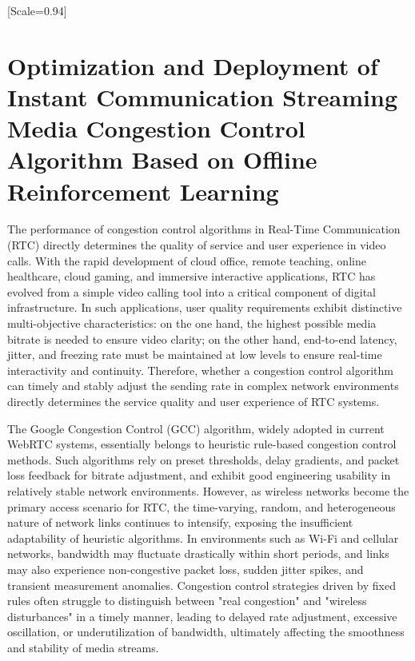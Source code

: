 
{
[Scale=0.94]
\chapter{Optimization and Deployment of Instant Communication Streaming Media Congestion Control Algorithm Based on Offline Reinforcement Learning}

The performance of congestion control algorithms in Real-Time Communication (RTC) directly determines the quality of service and user experience in video calls. With the rapid development of cloud office, remote teaching, online healthcare, cloud gaming, and immersive interactive applications, RTC has evolved from a simple video calling tool into a critical component of digital infrastructure. In such applications, user quality requirements exhibit distinctive multi-objective characteristics: on the one hand, the highest possible media bitrate is needed to ensure video clarity; on the other hand, end-to-end latency, jitter, and freezing rate must be maintained at low levels to ensure real-time interactivity and continuity. Therefore, whether a congestion control algorithm can timely and stably adjust the sending rate in complex network environments directly determines the service quality and user experience of RTC systems.

The Google Congestion Control (GCC) algorithm, widely adopted in current WebRTC systems, essentially belongs to heuristic rule-based congestion control methods. Such algorithms rely on preset thresholds, delay gradients, and packet loss feedback for bitrate adjustment, and exhibit good engineering usability in relatively stable network environments. However, as wireless networks become the primary access scenario for RTC, the time-varying, random, and heterogeneous nature of network links continues to intensify, exposing the insufficient adaptability of heuristic algorithms. In environments such as Wi-Fi and cellular networks, bandwidth may fluctuate drastically within short periods, and links may also experience non-congestive packet loss, sudden jitter spikes, and transient measurement anomalies. Congestion control strategies driven by fixed rules often struggle to distinguish between "real congestion" and "wireless disturbances" in a timely manner, leading to delayed rate adjustment, excessive oscillation, or underutilization of bandwidth, ultimately affecting the smoothness and stability of media streams.

}
